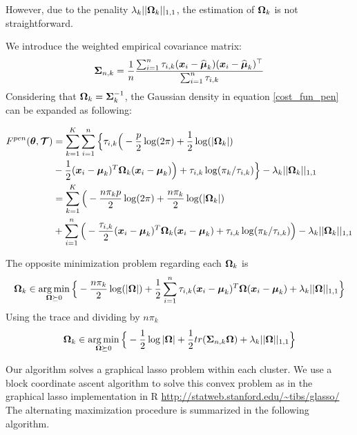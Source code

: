 However, due to the penality $\lambda_k||\boldsymbol\Omega_k||_{1,1}$, the estimation of $\boldsymbol\Omega_k$ is not straightforward.

We introduce the weighted empirical covariance matrix:
\begin{equation}
\boldsymbol\Sigma_{n,k} = \frac{1}{n}\frac{\sum_{i=1}^n\tau_{i,k}(\boldsymbol x_i-\widehat{\boldsymbol\mu}_k)(\boldsymbol x_i-\widehat{\boldsymbol\mu}_k)^\top}{\sum_{i=1}^n\tau_{i,k}}
\end{equation}
Considering that $\boldsymbol\Omega_k=\boldsymbol\Sigma_k^{-1}$, the Gaussian density in equation \eqref{cost_fun_pen} can be expanded as following:


\begin{align}
\label{cost_fun_pen_2}
F^{pen}({\boldsymbol\theta},\boldsymbol{\mathcal T})  &= \sum_{k=1}^K \sum_{i=1}^{n} \Big\{\tau_{i,k} \Big(
-\frac{p}{2}\log(2\pi)+\frac{1}{2}\log(|\boldsymbol\Omega_k|)\\
&-\frac{1}{2}(\boldsymbol x_i-\boldsymbol\mu_k)^T\boldsymbol\Omega_k(\boldsymbol x_i-\boldsymbol\mu_k) \Big)+\tau_{i,k} \log(\pi_k/\tau_{i,k})\Big\}-\lambda_k||\boldsymbol\Omega_k||_{1,1}\\
&= \sum_{k=1}^K \Big(-\frac{n\pi_k p}{2}\log(2\pi)+\frac{n\pi_k}{2}\log(|\boldsymbol\Omega_k|)\\
&+\sum_{i=1}^{n}\Big(-\frac{\tau_{i,k}}{2}(\boldsymbol x_i-\boldsymbol\mu_k)^T\boldsymbol\Omega_k(\boldsymbol x_i-\boldsymbol\mu_k)+\tau_{i,k} \log(\pi_k/\tau_{i,k})\Big) -\lambda_k||\boldsymbol\Omega_k||_{1,1} 
\end{align}

The opposite minimization problem regarding each $\boldsymbol\Omega_k$ is
\begin{equation}
\boldsymbol\Omega_k \in \operatorname*{arg\,min}_{ \boldsymbol\Omega\succeq 0}\Big\{-\frac{n\pi_k}{2}\log(|\boldsymbol\Omega|)+\frac{1}{2}\sum_{i=1}^{n}\tau_{i,k}(\boldsymbol x_i-\boldsymbol\mu_k)^T\boldsymbol\Omega(\boldsymbol x_i-\boldsymbol\mu_k)+\lambda_k||\boldsymbol\Omega||_{1,1}\Big\}
\end{equation}
Using the trace and dividing by $n\pi_k$
\begin{equation}
\boldsymbol\Omega_k \in \operatorname*{arg\,min}_{ \boldsymbol\Omega\succeq 0} \Big\{ -\frac{1}{2}\log|\boldsymbol\Omega| +\frac{1}{2} tr(\boldsymbol\Sigma_{n,k}\boldsymbol\Omega)+\lambda_k||\boldsymbol\Omega||_{1,1}\Big\}
\end{equation}

Our algorithm solves a graphical lasso problem within each cluster. We use a block coordinate ascent algorithm \citep{mazum_lasso} to solve this convex problem as in the graphical lasso implementation in R \url{http://statweb.stanford.edu/~tibs/glasso/} \\


The alternating maximization procedure is summarized in the following algorithm.



